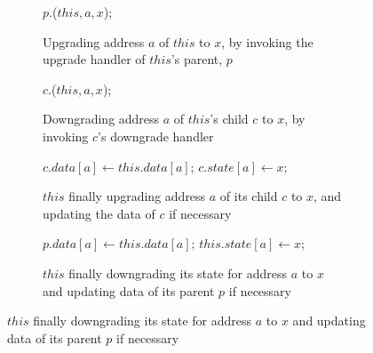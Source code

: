 \begin{figure}
\small

\begin{subfigure}{\linewidth}
\begin{boxedminipage}{\linewidth}
\begin{algorithmic}
  \State \call{} $p.$\uReq($this, a, x$);
\EndProc
\end{algorithmic}
\end{boxedminipage}
\caption{Upgrading address $a$ of $this$ to $x$, by invoking the upgrade handler
of $this$'s parent, $p$}
\label{uReq}
\end{subfigure}

\begin{subfigure}{\linewidth}
\begin{boxedminipage}{\linewidth}
\begin{algorithmic}
  \State \call{} $c.$\dReq($this, a, x$);
\EndProc
\end{algorithmic}
\end{boxedminipage}
\caption{Downgrading address $a$ of $this$'s child $c$ to $x$, by invoking
$c$'s downgrade handler}
\label{dReq}
\end{subfigure}

\begin{subfigure}{\linewidth}
\begin{boxedminipage}{\linewidth}
\begin{algorithmic}
    \State $c.data[a] \gets this.data[a]$;
  \EndIf
  \State $c.state[a] \gets x$;
\EndProc
\end{algorithmic}
\end{boxedminipage}
\caption{$this$ finally upgrading address $a$ of its child $c$ to $x$, and
updating the data of $c$ if necessary}
\label{uResp}
\end{subfigure}

\begin{subfigure}{\linewidth}
\begin{boxedminipage}{\linewidth}
\begin{algorithmic}
    \State $p.data[a] \gets this.data[a]$;
  \EndIf
  \State $this.state[a] \gets x$;
\EndProc
\end{algorithmic}
\end{boxedminipage}
\caption{$this$ finally downgrading its state for address $a$ to $x$ and
updating data of its parent $p$ if necessary}
\label{dResp}
\end{subfigure}


\end{figure}
